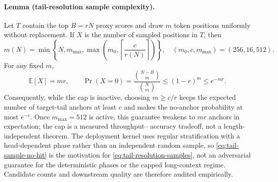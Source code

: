\paragraph{Lemma (tail-resolution sample complexity).}
Let $T$ contain the top $B=rN$ proxy scores and draw $m$ token positions
uniformly without replacement.  If $X$ is the number of sampled positions
in $T$, then
\begin{equation}
 m(N)=\min\!\left\{N,m_{\max},
 \max\!\left(m_0,\left\lceil\frac{c}{r(N)}\right\rceil\right)\right\},
 \quad (m_0,c,m_{\max})=(256,16,512).
 \label{eq:tail-resolution-samples}
\end{equation}
For any fixed $m$,
\begin{equation}
 \mathbb E[X]=mr,\qquad
 \Pr(X=0)=\frac{\binom{N-B}{m}}{\binom{N}{m}}
 \le (1-r)^m\le e^{-mr}.
 \label{eq:tail-sample-no-hit}
\end{equation}
Consequently, while the cap is inactive, choosing $m\ge c/r$ keeps the
expected number of target-tail anchors at least $c$ and makes the no-anchor
probability at most $e^{-c}$.  Once $m_{\max}=512$ is active, this guarantee
weakens to $mr$ anchors in expectation; the cap is a measured throughput--
accuracy tradeoff, not a length-independent theorem.  The deployment kernel uses
regular stratification with a head-dependent phase rather than an
independent random sample, so \cref{eq:tail-sample-no-hit} is the motivation
for \cref{eq:tail-resolution-samples}, not an adversarial guarantee for the
deterministic phases or the capped long-context regime.  Candidate counts and
downstream quality are therefore audited empirically.

